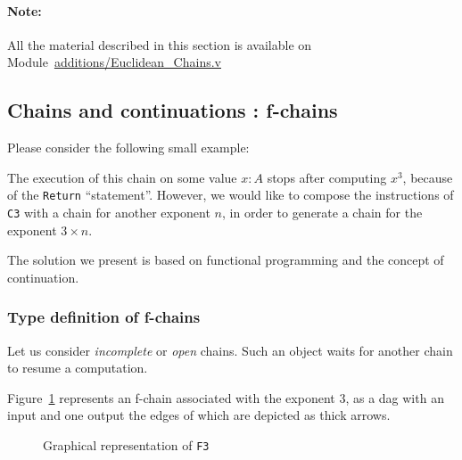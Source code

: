 \paragraph{Note:}
All the \coq{} material described in this section is available on 
 Module~\href{../theories/html/additions.Euclidean_Chains.html}{additions/Euclidean\_Chains.v}

\subsection{Chains and continuations : f-chains}


Please consider the following small example:



The execution of this chain on  some value $x:A$ stops after 
computing \texttt{$x^3$}, because of the \texttt{Return} ``statement''.
However, we would like to compose the instructions of \texttt{C3} 
with a chain for another exponent $n$, in order to generate a chain for 
the exponent $3\times n$.

  The solution we present is based on functional programming and the concept of continuation.



\subsubsection{Type definition of  f-chains}

Let us   consider \emph{incomplete} or \emph{open} chains.
Such an object waits for another chain to resume  a computation.

Figure~\ref{fig:F3-as-dag} represents an  f-chain associated with the exponent $3$, as a dag with an input and one output the edges of which are depicted as thick arrows.

\begin{figure}[h]
  \centering
  \caption{Graphical representation of \texttt{F3}}
  \label{fig:F3-as-dag}
\end{figure}

